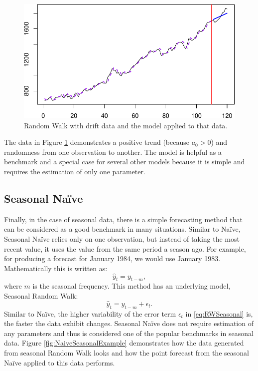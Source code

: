 \documentclass[
]{book}
\theoremstyle{definition}
\theoremstyle{definition}
\theoremstyle{definition}
\theoremstyle{definition}
\theoremstyle{remark}
\begin{document}
\begin{figure}
\centering
\includegraphics{Svetunkov--2022----ADAM_files/figure-latex/RWDriftExample-1.pdf}
\caption{\label{fig:RWDriftExample}Random Walk with drift data and the model applied to that data.}
\end{figure}

The data in Figure \ref{fig:RWDriftExample} demonstrates a positive trend (because \(a_0>0\)) and randomness from one observation to another. The model is helpful as a benchmark and a special case for several other models because it is simple and requires the estimation of only one parameter.

\hypertarget{NaiveSeasonal}{%
\subsection{Seasonal Naïve}\label{NaiveSeasonal}}

Finally, in the case of seasonal data, there is a simple forecasting method that can be considered as a good benchmark in many situations. Similar to Naïve, Seasonal Naïve relies only on one observation, but instead of taking the most recent value, it uses the value from the same period a season ago. For example, for producing a forecast for January 1984, we would use January 1983. Mathematically this is written as:
\begin{equation}
    \hat{y}_t = y_{t-m} ,
    \label{eq:NaiveSeasonal}
\end{equation}
where \(m\) is the seasonal frequency. This method has an underlying model, Seasonal Random Walk:
\begin{equation}
    \hat{y}_t = y_{t-m} + \epsilon_t.
    \label{eq:RWSeasonal}
\end{equation}
Similar to Naïve, the higher variability of the error term \(\epsilon_t\) in \eqref{eq:RWSeasonal} is, the faster the data exhibit changes. Seasonal Naïve does not require estimation of any parameters and thus is considered one of the popular benchmarks in seasonal data. Figure \ref{fig:NaiveSeasonalExample} demonstrates how the data generated from seasonal Random Walk looks and how the point forecast from the seasonal Naïve applied to this data performs.
\end{document}
